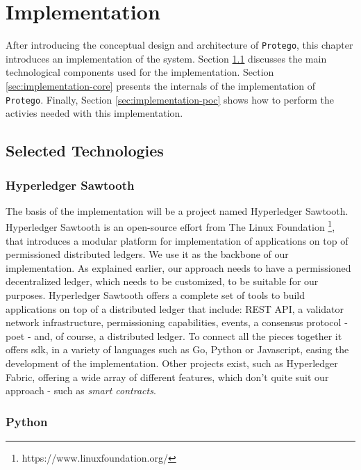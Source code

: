 \chapter{Implementation}
\label{chap:implementation}

After introducing the conceptual design and architecture of \texttt{Protego}, this chapter introduces an implementation of the system. Section \ref{sec:implementation-technology} discusses the main technological components used for the implementation. Section \ref{sec:implementation-core} presents the internals of the implementation of \texttt{Protego}. Finally, Section \ref{sec:implementation-poc} shows how to perform the activies needed with this implementation.

\section{Selected Technologies}
\label{sec:implementation-technology}

\subsection{Hyperledger Sawtooth}

The basis of the implementation will be a project named Hyperledger Sawtooth. Hyperledger Sawtooth is an open-source effort from The Linux Foundation \footnote{https://www.linuxfoundation.org/}, that introduces a modular platform for implementation of applications on top of permissioned distributed ledgers. We use it as the backbone of our implementation. As explained earlier, our approach needs to have a permissioned decentralized ledger, which needs to be customized, to be suitable for our purposes. Hyperledger Sawtooth offers a complete set of tools to build applications on top of a distributed ledger that include: REST API, a validator network infrastructure, permissioning capabilities, events, a consensus protocol - \gls{poet} - and, of course, a distributed ledger. To connect all the pieces together it offers \gls{sdk}, in a variety of languages such as Go, Python or Javascript, easing the development of the implementation. Other projects exist, such as Hyperledger Fabric, offering a wide array of different features, which don't quite suit our approach - such as \textit{smart contracts}.

\subsection{Python}

